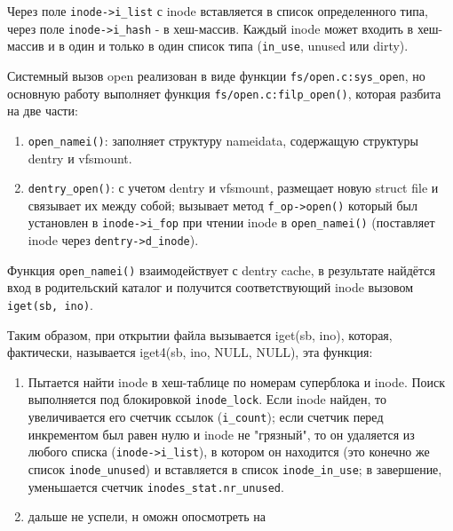 Через поле \verb|inode->i_list| с inode вставляется в список определенного типа, через поле \verb|inode->i_hash| - в хеш-массив. Каждый inode может входить в хеш-массив и в один и только в один список типа (\verb|in_use|, unused или dirty).

Системный вызов open реализован в виде функции \verb|fs/open.c:sys_open|, но основную работу выполняет функция \verb|fs/open.c:filp_open()|, которая разбита на две части:
\begin{enumerate}
	\item \verb|open_namei()|: заполняет структуру nameidata, содержащую структуры dentry и vfsmount.
	\item \verb|dentry_open()|: с учетом dentry и vfsmount, размещает новую struct file и связывает их между собой; вызывает метод \verb|f_op->open()| который был установлен в \verb|inode->i_fop| при чтении inode в \verb|open_namei()| (поставляет inode через \verb|dentry->d_inode|).
\end{enumerate}

Функция \verb|open_namei()| взаимодействует с dentry cache, в результате найдётся вход в родительский каталог и получится соответствующий inode вызовом \verb|iget(sb, ino)|.

Таким образом, при открытии файла вызывается iget(sb, ino), которая, фактически, называется iget4(sb, ino, NULL, NULL), эта функция:
\begin{enumerate}
	\item Пытается найти inode в хеш-таблице по номерам суперблока и inode. Поиск выполняется под блокировкой \verb|inode_lock|. Если inode найден, то увеличивается его счетчик ссылок (\verb|i_count|); если счетчик перед инкрементом был равен нулю и inode не "грязный", то он удаляется из любого списка (\verb|inode->i_list|), в котором он находится (это конечно же список \verb|inode_unused|) и вставляется в список \verb|inode_in_use|; в завершение, уменьшается счетчик \verb|inodes_stat.nr_unused|.
	\item дальше не успели, н оможн опосмотреть на \cite{rus-linux.net_VFS}
\end{enumerate}


